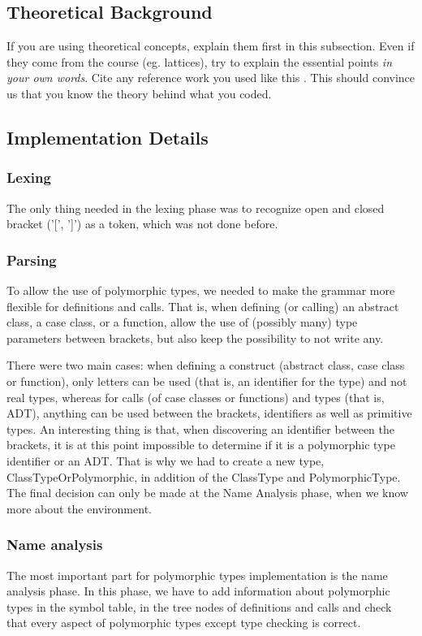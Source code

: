 \subsection{Theoretical Background}
If you are using theoretical concepts, explain them first in this subsection.
Even if they come from the course (eg. lattices), try to explain the essential
points \emph{in your own words}. Cite any reference work you used like this
\cite{TigerBook}. This should convince us that you know the theory behind what
you coded. 

\subsection{Implementation Details}
\subsubsection{Lexing}
The only thing needed in the lexing phase was to recognize open and closed bracket ('[', ']') as a token, which was not done before.
\subsubsection{Parsing}
To allow the use of polymorphic types, we needed to make the grammar more flexible for definitions and calls. That is, when defining (or calling) an abstract class, a case class, or a function, allow the use of (possibly many) type parameters between brackets, but also keep the possibility to not write any. 

There were two main cases: when defining a construct (abstract class, case class or function), only letters can be used (that is, an identifier for the type) and not real types, whereas for calls (of case classes or functions) and types (that is, ADT), anything can be used between the brackets, identifiers as well as primitive types. An interesting thing is that, when discovering an identifier between the brackets, it is at this point impossible to determine if it is a polymorphic type identifier or an ADT. That is why we had to create a new type, ClassTypeOrPolymorphic, in addition of the ClassType and PolymorphicType. The final decision can only be made at the Name Analysis phase, when we know more about the environment.
\subsubsection{Name analysis}
The most important part for polymorphic types implementation is the name analysis phase. In this phase, we have to add information about polymorphic types in the symbol table, in the tree nodes of definitions and calls and check that every aspect of polymorphic types except type checking is correct.

